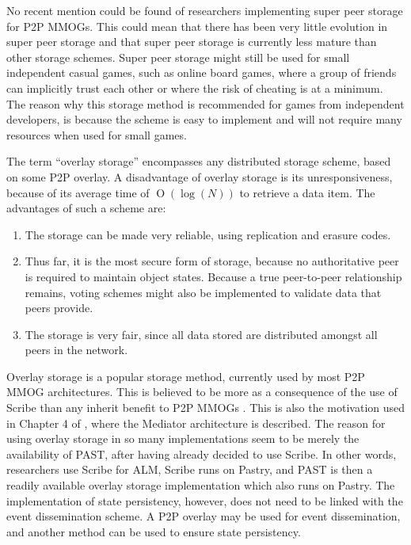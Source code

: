 \documentclass[10pt,a4paper,journal,cspaper,compsoc]{IEEEtran}
\providecommand{\OO}[1]{\operatorname{O}\left(#1\right)}
\begin{document}
No recent mention could be found of researchers implementing super peer storage for P2P MMOGs. This could mean that there has been very little
evolution in super peer storage and that super peer storage is currently less mature than other storage schemes. Super peer storage might still be
used for small independent casual games, such as online board games, where a group of friends can implicitly trust each other or where the risk of
cheating is at a minimum. The reason why this storage method is recommended for games from independent developers, is because the scheme is easy to
implement and will not require many resources when used for small games.

The term ``overlay storage'' encompasses any distributed storage scheme, based on some P2P overlay. A disadvantage of overlay storage is its
unresponsiveness, because of its average time of $\OO{\log(N)}$ to retrieve a data item. The advantages of such a scheme are:
%
\begin{enumerate}
    \item The storage can be made very reliable, using replication and erasure codes.
    \item Thus far, it is the most secure form of storage, because no authoritative peer is required to maintain object states. Because a true
        peer-to-peer relationship remains, voting schemes might also be implemented to validate data that peers provide.
    \item The storage is very fair, since all data stored are distributed amongst all peers in the network.
\end{enumerate}

Overlay storage is a popular storage method, currently used by most P2P MMOG architectures. This is believed to be more as a consequence of the use
of Scribe \cite{scribe} than any inherit benefit to P2P MMOGs \cite{past_storage_focus}. This is also the motivation used in Chapter 4 of
\cite{Fan_phd}, where the Mediator architecture is described. The reason for using overlay storage in so many implementations seem to be merely the
availability of PAST, after having already decided to use Scribe. In other words, researchers use Scribe for ALM, Scribe runs on Pastry, and PAST is
then a readily available overlay storage implementation which also runs on Pastry. The implementation of state persistency, however, does not need to
be linked with the event dissemination scheme. A P2P overlay may be used for event dissemination, and another method can be used to ensure state
persistency.
\end{document}
